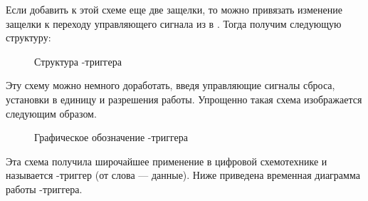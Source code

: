 

\par{Если добавить к этой схеме еще две защелки, то можно привязать изменение  защелки к переходу управляющего сигнала из  в . Тогда получим следующую структуру:}

\begin{figure}[H]
  \centering
  \def\svgwidth{\columnwidth}
  
  \caption{Структура -триггера}
\end{figure}

\par{Эту схему можно немного доработать, введя управляющие сигналы сброса, установки в единицу и разрешения работы. Упрощенно такая схема изображается следующим образом.}

\begin{figure}[H]
  \centering
  \def\svgwidth{\columnwidth}
  
  \caption{Графическое обозначение -триггера}
\end{figure}

\par{Эта схема получила широчайшее применение в цифровой схемотехнике и называется -триггер (от слова  — данные). Ниже приведена временная диаграмма работы -триггера.}


